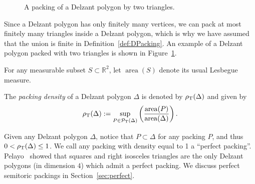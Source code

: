 \documentclass[10pt,a4paper]{amsart}
\numberwithin{equation}{section}
\newcommand{\triangleline}{dashed}
\def\R{{\mathbb R}}
\newcommand{\De}{\Delta}
\newcommand{\area}{\operatorname{area}}
\newcommand{\PT}{\mathcal{P}_{\rm T}}
\theoremstyle{definition}
\theoremstyle{plain}
\theoremstyle{plain}
\begin{document}
 \begin{figure}%
 \centering
 \caption{A packing of a Delzant polygon by two triangles.}
 \label{fig:delz_pack}
 \end{figure}


Since a Delzant polygon has only finitely many vertices, we can pack at most finitely many triangles inside a Delzant polygon, which is why we have assumed that the union is finite in Definition~\ref{def:DPacking}.
An example of a Delzant polygon packed with two triangles is shown in Figure~\ref{fig:delz_pack}.





For any measurable subset $S\subset \R^2$, let $\area(S)$ denote its usual Lesbegue measure.



\begin{Definition}\label{def:toric-density}
The \emph{packing density} of a Delzant polygon $\De$ is denoted by $\rho_{{\rm T}}(\De)$ and given by
\[
 \rho_{{\rm T}}(\De): = \sup_{P \in \PT(\De)}\left( \frac{\area(P)}{\area(\De)}\right).
\]
\end{Definition}

Given any Delzant polygon $\De$, notice that $P\subset \De$ for any packing $P$, and thus $0<\rho_{{\rm T}}(\De)\leq 1$.
We call any packing with density equal to 1 a ``perfect packing''. Pelayo~\cite{Pe2006} showed that squares and right isosceles triangles are the only Delzant polygons (in dimension $4$) which admit a perfect packing.
We discuss perfect semitoric packings in Section~\ref{sec:perfect}.
\end{document}
